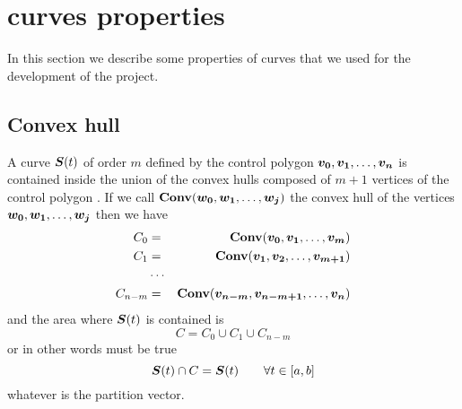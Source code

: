 \documentclass[dissertation.tex]{subfiles}
\begin{document}
\section{\bss curves properties}\label{sec:bsplineProp}
In this section we describe some properties of \bs curves that we
used for the development of the project.

\subsection{Convex hull}\label{sec:convexHull}
A \bs curve $\boldsymbol{S}(t)$ of order $m$ defined by the control polygon
$\boldsymbol{v_0},\boldsymbol{v_1},\dots,\boldsymbol{v_n}$ is contained inside the union of the
convex hulls composed of $m+1$ vertices of the control polygon
\cite{farin}. If we
call $\mathbf{Conv}(\boldsymbol{w_0},\boldsymbol{w_1},\dots,\boldsymbol{w_j})$ the convex hull of the
vertices $\boldsymbol{w_0},\boldsymbol{w_1},\dots,\boldsymbol{w_j}$ then we have
\begin{eqnarray*}
  C_0&=&\mathbf{Conv}(\boldsymbol{v_0},\boldsymbol{v_1},\dots,\boldsymbol{v_{m}})\\
  C_1&=&\mathbf{Conv}(\boldsymbol{v_1},\boldsymbol{v_2},\dots,\boldsymbol{v_{m+1}})\\
  &\cdots&\\
  C_{n-m}&=&\mathbf{Conv}(\boldsymbol{v_{n-m}},\boldsymbol{v_{n-m+1}},\dots,\boldsymbol{v_{n}})\\
\end{eqnarray*}
and the area where $\boldsymbol{S}(t)$ is contained is
\begin{equation*}
  C=C_0\cup C_1\cup C_{n-m}
\end{equation*}
or in other words must be true
\begin{equation*}
  \boldsymbol{S}(t)\cap C =\boldsymbol{S}(t)\qquad \forall t\in[a,b]
\end{equation*}
whatever is the partition vector.
\end{document}

